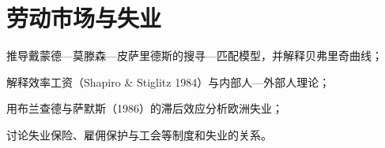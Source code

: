\chapter{劳动市场与失业}\label{ch:labor}

\begin{chapterguide}
\begin{guidegoals}
\item 推导戴蒙德—莫滕森—皮萨里德斯的搜寻—匹配模型，并解释贝弗里奇曲线；
\item 解释效率工资（Shapiro \& Stiglitz 1984）与内部人—外部人理论；
\item 用布兰查德与萨默斯（1986）的滞后效应分析欧洲失业；
\item 讨论失业保险、雇佣保护与工会等制度和失业的关系。
\end{guidegoals}
\end{chapterguide}

\chapterstub
